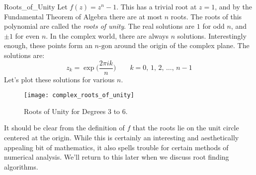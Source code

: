     \begin{lexample}{}{Roots_of_Unity}
        Let $f(z)=z^{n}-1$. This has a trivial root
        at $z=1$, and by the Fundamental Theorem of Algebra there are
        at most $n$ roots. The roots of this polynomial are called the
        \textit{roots of unity}. The real solutions are $1$ for odd $n$,
        and $\pm{1}$ for even $n$. In the complex world, there are
        always $n$ solutions. Interestingly enough, these points form an
        $n\textrm{-gon}$ around the origin of the complex plane. The
        solutions are:
        \begin{equation}
            z_{k}=\exp\Big(\frac{2\pi{i}{k}}{n}\Big)
            \quad\quad
            k=0,\,1,\,2,\,\dots,\,n-1
        \end{equation}
        Let's plot these solutions for various $n$.
        \begin{figure}[H]
            \centering
            \captionsetup{type=figure}
            \texttt{[image: complex\_roots\_of\_unity]}
            \caption{Roots of Unity for Degrees 3 to 6.}
            \label{fig:Comp_Roots_Unity}
        \end{figure}
        It should be clear from the definition of $f$ that the roots lie
        on the unit circle centered at the origin.
        While this is certainly an interesting and aesthetically
        appealing bit of mathematics, it also spells trouble for
        certain methods of numerical analysis. We'll return to
        this later when we discuss root finding algorithms.
    \end{lexample}
